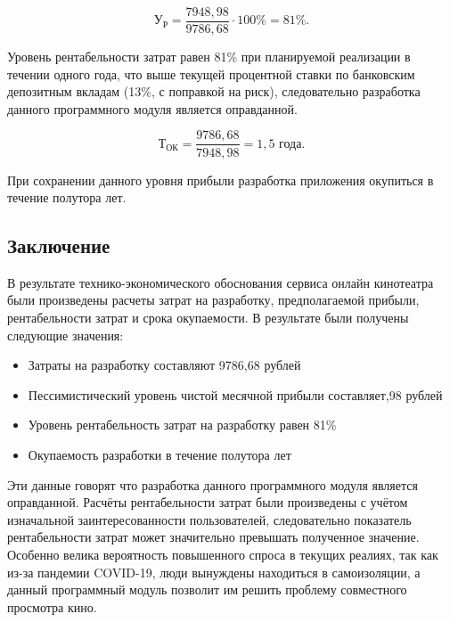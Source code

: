 \begin{equation}
 \label{eq:econ:add_payment}
 \text{У}_\text{Р} = \frac{7948,98}{9786,68} \cdot 100\% = 81\%.
\end{equation}
 
Уровень рентабельности затрат равен 81\% при планируемой реализации в течении одного года, что выше текущей процентной ставки по банковским депозитным вкладам (13\%, с поправкой на риск), следовательно разработка данного программного модуля является оправданной.
 
\begin{equation}
 \label{eq:econ:add_payment}
 \text{Т}_\text{ОК} = \frac{9786,68}{7948,98} = 1,5  \text{ года.}
\end{equation}
 
При сохранении данного уровня прибыли разработка приложения окупиться в течение полутора лет.
 
\subsection{Заключение}
В результате технико-экономического обоснования сервиса онлайн кинотеатра были произведены расчеты затрат на разработку, предполагаемой прибыли, рентабельности затрат и срока окупаемости. В результате были получены следующие значения:
\begin{itemize}
 \item Затраты на разработку составляют 9786,68 рублей
 \item Пессимистический уровень чистой месячной прибыли составляет,98 рублей
 \item Уровень рентабельность затрат на разработку равен 81\%
 \item Окупаемость разработки в течение  полутора лет
\end{itemize}
 Эти данные говорят что разработка данного программного модуля является оправданной. Расчёты рентабельности затрат были произведены с учётом изначальной заинтересованности пользователей, следовательно   показатель рентабельности затрат может значительно превышать полученное значение. Особенно велика вероятность повышенного спроса в текущих реалиях, так как из-за пандемии  COVID-19, люди вынуждены находиться в самоизоляции, а данный программный модуль позволит им решить проблему совместного просмотра кино.
 



